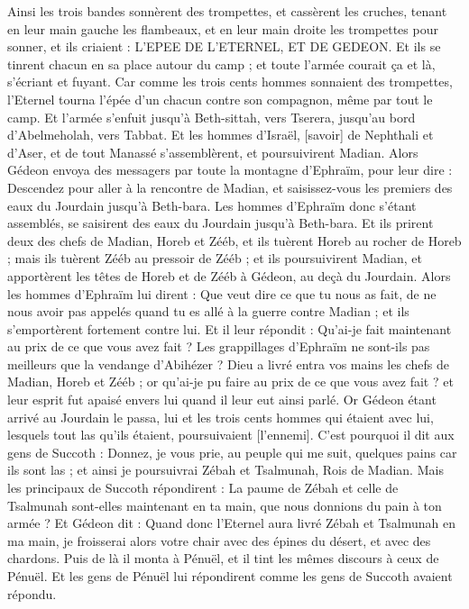 \begin{multicols}{2}
Ainsi les trois bandes sonnèrent des trompettes, et cassèrent les cruches, tenant en leur main gauche les flambeaux, et en leur main droite les trompettes pour sonner, et ils criaient : L'EPEE DE L'ETERNEL, ET DE GEDEON.
Et ils se tinrent chacun en sa place autour du camp ; et toute l'armée courait ça et là, s'écriant et fuyant.
Car comme les trois cents hommes sonnaient des trompettes, l'Eternel tourna l'épée d'un chacun contre son compagnon, même par tout le camp. Et l'armée s'enfuit jusqu'à Beth-sittah, vers Tserera, jusqu'au bord d'Abelmeholah, vers Tabbat.
Et les hommes d'Israël, [savoir] de Nephthali et d'Aser, et de tout Manassé s'assemblèrent, et poursuivirent Madian.
Alors Gédeon envoya des messagers par toute la montagne d'Ephraïm, pour leur dire : Descendez pour aller à la rencontre de Madian, et saisissez-vous les premiers des eaux du Jourdain jusqu'à Beth-bara. Les hommes d'Ephraïm donc s'étant assemblés, se saisirent des eaux du Jourdain jusqu'à Beth-bara.
Et ils prirent deux des chefs de Madian, Horeb et Zééb, et ils tuèrent Horeb au rocher de Horeb ; mais ils tuèrent Zééb au pressoir de Zééb ; et ils poursuivirent Madian, et apportèrent les têtes de Horeb et de Zééb à Gédeon, au deçà du Jourdain.
\VerseOne{}Alors les hommes d'Ephraïm lui dirent : Que veut dire ce que tu nous as fait, de ne nous avoir pas appelés quand tu es allé à la guerre contre Madian ; et ils s'emportèrent fortement contre lui.
Et il leur répondit : Qu'ai-je fait maintenant au prix de ce que vous avez fait ? Les grappillages d'Ephraïm ne sont-ils pas meilleurs que la vendange d'Abihézer ?
Dieu a livré entra vos mains les chefs de Madian, Horeb et Zééb ; or qu'ai-je pu faire au prix de ce que vous avez fait ? et leur esprit fut apaisé envers lui quand il leur eut ainsi parlé.
Or Gédeon étant arrivé au Jourdain le passa, lui et les trois cents hommes qui étaient avec lui, lesquels tout las qu'ils étaient, poursuivaient [l'ennemi].
C'est pourquoi il dit aux gens de Succoth : Donnez, je vous prie, au peuple qui me suit, quelques pains car ils sont las ; et ainsi je poursuivrai Zébah et Tsalmunah, Rois de Madian.
Mais les principaux de Succoth répondirent : La paume de Zébah et celle de Tsalmunah sont-elles maintenant en ta main, que nous donnions du pain à ton armée ?
Et Gédeon dit : Quand donc l'Eternel aura livré Zébah et Tsalmunah en ma main, je froisserai alors votre chair avec des épines du désert, et avec des chardons.
Puis de là il monta à Pénuël, et il tint les mêmes discours à ceux de Pénuël. Et les gens de Pénuël lui répondirent comme les gens de Succoth avaient répondu.

\end{multicols}
